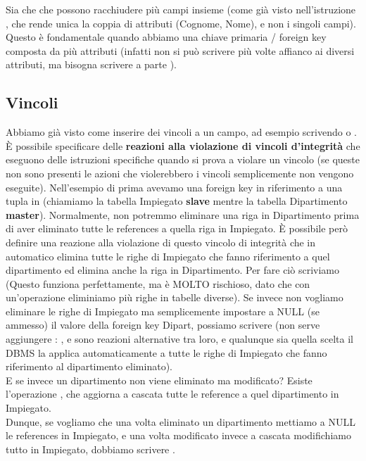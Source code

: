 \documentclass[11pt, a4paper, titlepage, oneside]{scrbook}
\begin{document}
Sia  che  che  possono racchiudere più campi insieme (come già visto nell'istruzione , che rende unica la coppia di attributi (Cognome, Nome), e non i singoli campi). Questo è fondamentale quando abbiamo una chiave primaria / foreign key composta da più attributi (infatti non si può scrivere più volte  affianco ai diversi attributi, ma bisogna scrivere a parte ).

\subsection*{Vincoli}

Abbiamo già visto come inserire dei vincoli a un campo, ad esempio scrivendo  o . È possibile specificare delle \textbf{reazioni alla violazione di vincoli d'integrità} che eseguono delle istruzioni specifiche quando si prova a violare un vincolo (se queste non sono presenti le azioni che violerebbero i vincoli semplicemente non vengono eseguite). Nell'esempio di prima avevamo una foreign key  in riferimento a una tupla in  (chiamiamo la tabella Impiegato \textbf{slave} mentre la tabella Dipartimento \textbf{master}). Normalmente, non potremmo eliminare una riga in Dipartimento prima di aver eliminato tutte le references a quella riga in Impiegato. È possibile però definire una reazione alla violazione di questo vincolo di integrità che in automatico elimina tutte le righe di Impiegato che fanno riferimento a quel dipartimento ed elimina anche la riga in Dipartimento. Per fare ciò scriviamo  (\NB Questo funziona perfettamente, ma è MOLTO rischioso, dato che con un'operazione eliminiamo più righe in tabelle diverse). Se invece non vogliamo eliminare le righe di Impiegato ma semplicemente impostare a NULL (se ammesso) il valore della foreign key Dipart, possiamo scrivere  (non serve aggiungere : ,  e  sono reazioni alternative tra loro, e qualunque sia quella scelta il DBMS la applica automaticamente a tutte le righe di Impiegato che fanno riferimento al dipartimento eliminato). \\
E se invece un dipartimento non viene eliminato ma modificato? Esiste l'operazione , che aggiorna a cascata tutte le reference a quel dipartimento in Impiegato. \\
Dunque, se vogliamo che una volta eliminato un dipartimento mettiamo a NULL le references in Impiegato, e una volta modificato invece a cascata modifichiamo tutto in Impiegato, dobbiamo scrivere .
\end{document}
